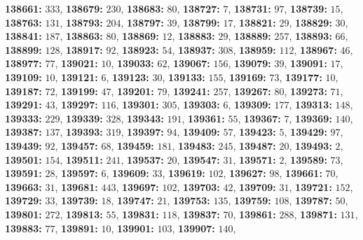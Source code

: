 \textsf{\bfseries 138661:} $333$, \textsf{\bfseries 138679:} $230$, \textsf{\bfseries 138683:} $80$, \textsf{\bfseries 138727:} $7$, \textsf{\bfseries 138731:} $97$, \textsf{\bfseries 138739:} $15$, \textsf{\bfseries 138763:} $131$, \textsf{\bfseries 138793:} $204$, \textsf{\bfseries 138797:} $39$, \textsf{\bfseries 138799:} $17$, \textsf{\bfseries 138821:} $29$, \textsf{\bfseries 138829:} $30$, \textsf{\bfseries 138841:} $187$, \textsf{\bfseries 138863:} $80$, \textsf{\bfseries 138869:} $12$, \textsf{\bfseries 138883:} $29$, \textsf{\bfseries 138889:} $257$, \textsf{\bfseries 138893:} $66$, \textsf{\bfseries 138899:} $128$, \textsf{\bfseries 138917:} $92$, \textsf{\bfseries 138923:} $54$, \textsf{\bfseries 138937:} $308$, \textsf{\bfseries 138959:} $112$, \textsf{\bfseries 138967:} $46$, \textsf{\bfseries 138977:} $77$, \textsf{\bfseries 139021:} $10$, \textsf{\bfseries 139033:} $62$, \textsf{\bfseries 139067:} $156$, \textsf{\bfseries 139079:} $39$, \textsf{\bfseries 139091:} $17$, \textsf{\bfseries 139109:} $10$, \textsf{\bfseries 139121:} $6$, \textsf{\bfseries 139123:} $30$, \textsf{\bfseries 139133:} $155$, \textsf{\bfseries 139169:} $73$, \textsf{\bfseries 139177:} $10$, \textsf{\bfseries 139187:} $72$, \textsf{\bfseries 139199:} $47$, \textsf{\bfseries 139201:} $79$, \textsf{\bfseries 139241:} $257$, \textsf{\bfseries 139267:} $80$, \textsf{\bfseries 139273:} $71$, \textsf{\bfseries 139291:} $43$, \textsf{\bfseries 139297:} $116$, \textsf{\bfseries 139301:} $305$, \textsf{\bfseries 139303:} $6$, \textsf{\bfseries 139309:} $177$, \textsf{\bfseries 139313:} $148$, \textsf{\bfseries 139333:} $229$, \textsf{\bfseries 139339:} $328$, \textsf{\bfseries 139343:} $191$, \textsf{\bfseries 139361:} $55$, \textsf{\bfseries 139367:} $7$, \textsf{\bfseries 139369:} $140$, \textsf{\bfseries 139387:} $137$, \textsf{\bfseries 139393:} $319$, \textsf{\bfseries 139397:} $94$, \textsf{\bfseries 139409:} $57$, \textsf{\bfseries 139423:} $5$, \textsf{\bfseries 139429:} $97$, \textsf{\bfseries 139439:} $92$, \textsf{\bfseries 139457:} $68$, \textsf{\bfseries 139459:} $181$, \textsf{\bfseries 139483:} $245$, \textsf{\bfseries 139487:} $20$, \textsf{\bfseries 139493:} $2$, \textsf{\bfseries 139501:} $154$, \textsf{\bfseries 139511:} $241$, \textsf{\bfseries 139537:} $20$, \textsf{\bfseries 139547:} $31$, \textsf{\bfseries 139571:} $2$, \textsf{\bfseries 139589:} $73$, \textsf{\bfseries 139591:} $28$, \textsf{\bfseries 139597:} $6$, \textsf{\bfseries 139609:} $33$, \textsf{\bfseries 139619:} $102$, \textsf{\bfseries 139627:} $98$, \textsf{\bfseries 139661:} $70$, \textsf{\bfseries 139663:} $31$, \textsf{\bfseries 139681:} $443$, \textsf{\bfseries 139697:} $102$, \textsf{\bfseries 139703:} $42$, \textsf{\bfseries 139709:} $31$, \textsf{\bfseries 139721:} $152$, \textsf{\bfseries 139729:} $33$, \textsf{\bfseries 139739:} $18$, \textsf{\bfseries 139747:} $21$, \textsf{\bfseries 139753:} $135$, \textsf{\bfseries 139759:} $108$, \textsf{\bfseries 139787:} $50$, \textsf{\bfseries 139801:} $272$, \textsf{\bfseries 139813:} $55$, \textsf{\bfseries 139831:} $118$, \textsf{\bfseries 139837:} $70$, \textsf{\bfseries 139861:} $288$, \textsf{\bfseries 139871:} $131$, \textsf{\bfseries 139883:} $77$, \textsf{\bfseries 139891:} $10$, \textsf{\bfseries 139901:} $103$, \textsf{\bfseries 139907:} $140$, 
